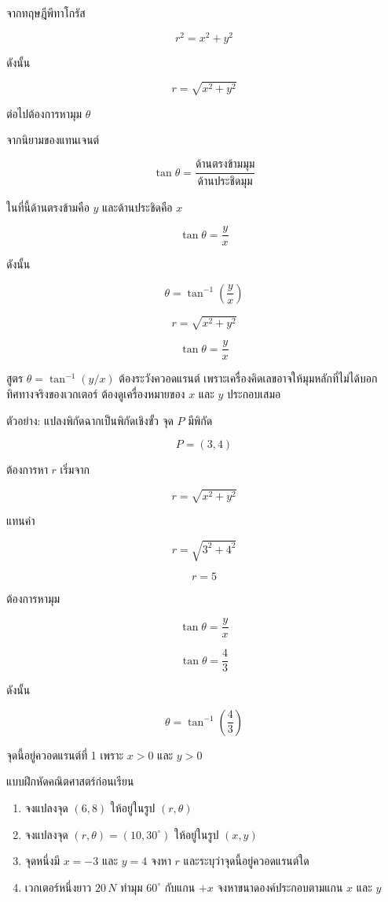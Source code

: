 \documentclass[12pt,a4paper]{report}
\begin{document}
จากทฤษฎีพีทาโกรัส

\[
r^2=x^2+y^2
\]

ดังนั้น

\[
r=\sqrt{x^2+y^2}
\]

ต่อไปต้องการหามุม $\theta$

จากนิยามของแทนเจนต์

\[
\tan\theta=\frac{\text{ด้านตรงข้ามมุม}}{\text{ด้านประชิดมุม}}
\]

ในที่นี้ด้านตรงข้ามคือ $y$ และด้านประชิดคือ $x$

\[
\tan\theta=\frac{y}{x}
\]

ดังนั้น

\[
\theta=\tan^{-1}\left(\frac{y}{x}\right)
\]

\begin{tcolorbox}[title={สูตรแปลงจาก $(x,y)$ ไปเป็น $(r,\theta)$}]
\[
r=\sqrt{x^2+y^2}
\]

\[
\tan\theta=\frac{y}{x}
\]
\end{tcolorbox}

\begin{tcolorbox}[title=จุดที่นักเรียนมักพลาด]
สูตร $\theta=\tan^{-1}(y/x)$ ต้องระวังควอดแรนต์ เพราะเครื่องคิดเลขอาจให้มุมหลักที่ไม่ได้บอกทิศทางจริงของเวกเตอร์ ต้องดูเครื่องหมายของ $x$ และ $y$ ประกอบเสมอ
\end{tcolorbox}

\begin{examplebox}{ตัวอย่าง: แปลงพิกัดฉากเป็นพิกัดเชิงขั้ว}
จุด $P$ มีพิกัด

\[
P=(3,4)
\]

ต้องการหา $r$ เริ่มจาก

\[
r=\sqrt{x^2+y^2}
\]

แทนค่า

\[
r=\sqrt{3^2+4^2}
\]

\[
r=5
\]

ต้องการหามุม

\[
\tan\theta=\frac{y}{x}
\]

\[
\tan\theta=\frac{4}{3}
\]

ดังนั้น

\[
\theta=\tan^{-1}\left(\frac{4}{3}\right)
\]

จุดนี้อยู่ควอดแรนต์ที่ 1 เพราะ $x>0$ และ $y>0$
\end{examplebox}

\begin{exercisebox}{แบบฝึกหัดคณิตศาสตร์ก่อนเรียน}
\begin{enumerate}
    \item จงแปลงจุด $(6,8)$ ให้อยู่ในรูป $(r,\theta)$
    \item จงแปลงจุด $(r,\theta)=(10,30^\circ)$ ให้อยู่ในรูป $(x,y)$
    \item จุดหนึ่งมี $x=-3$ และ $y=4$ จงหา $r$ และระบุว่าจุดนี้อยู่ควอดแรนต์ใด
    \item เวกเตอร์หนึ่งยาว $20\,\si{N}$ ทำมุม $60^\circ$ กับแกน $+x$ จงหาขนาดองค์ประกอบตามแกน $x$ และ $y$
\end{enumerate}
\end{exercisebox}
\end{document}
